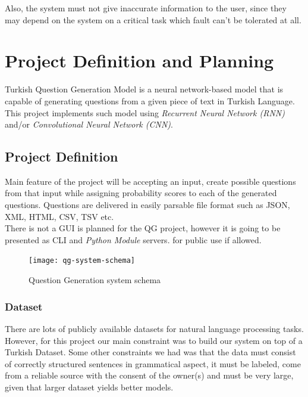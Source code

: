 \documentclass{mefsdp}
\begin{document}
	Also, the system must not give inaccurate information to the user, since they may depend on the system on a critical task which fault can’t be tolerated at all.
	
	\section{Project Definition and Planning}
	Turkish Question Generation Model is a neural network-based model that is capable of generating questions from a given piece of text in Turkish Language. This project implements such model using \textit{Recurrent Neural Network (RNN)} and/or \textit{Convolutional Neural Network (CNN)}.
	
	\subsection{Project Definition}
	Main feature of the project will be accepting an input, create possible questions from that input while assigning probability scores to each of the generated questions. Questions are delivered in easily parsable file format such as JSON, XML, HTML, CSV, TSV etc.\\
	
	There is not a GUI is planned for the QG project, however it is going to be presented as CLI and \textit{Python Module}\footnotemark {} servers. for public use if allowed.
\\
	
	\begin{figure}[ht!]
		\centering
		\texttt{[image: qg-system-schema]}
		\caption{Question Generation system schema}
	\end{figure}

	\subsubsection{Dataset}
	There are lots of publicly available datasets for natural language processing tasks. However, for this project our main constraint was to build our system on top of a Turkish Dataset. Some other constraints we had was that the data must consist of correctly structured sentences in grammatical aspect, it must be labeled, come from a reliable source with the consent of the owner(s) and must be very large, given that larger dataset yields better models.
	
\end{document}
